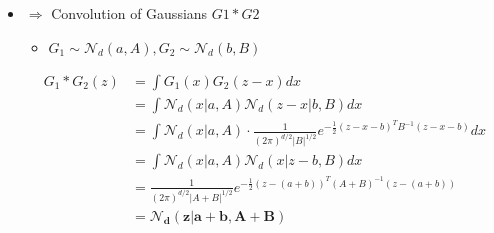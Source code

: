 \begin{itemize}
\begin{itemize}
 			\item $\Rightarrow$ Convolution of Gaussians $G1* G2$
	 			\begin{itemize}
	 			\item $G_1\sim \mathcal N_d(a,A),G_2\sim \mathcal N_d(b,B)$
	 			\end{itemize}
 			\begin{align*} \displaystyle G_1* G_2 (z) &= \int G_1(x)G_2(z-x)dx \\ &= \int \mathcal N_d (x|a,A)\mathcal N_d(z-x|b,B)dx \\ &= \int \mathcal N_d (x|a,A) \cdot \frac 1 {(2\pi)^{d/2} |B|^{1/2}} e^{-\frac 12 (z-x-b)^TB^{-1} (z-x-b)} dx \\ &= \int \mathcal N_d (x|a,A)\mathcal N_d(x|z-b,B)dx \\&= \frac 1 {(2\pi)^{d/2}|A+B|^{1/2}} e^{-\frac 12(z-(a+b))^T (A+B)^{-1} (z-(a+b))} \\&= \boldsymbol{\mathcal N_d(z|a+b,A+B)}  
 			\end{align*}
 		\end{itemize}
 \end{itemize}